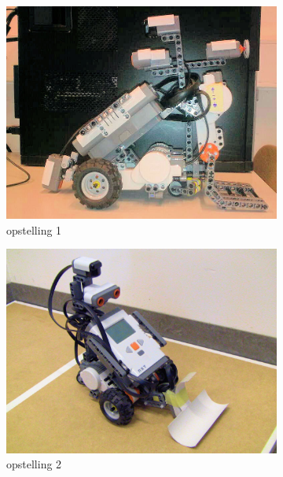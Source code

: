 \documentclass[tt2]{penoverslag}
\begin{document}
\begin{figure}
\centering
	\begin{subfigure}[h]{0.33\textwidth}
	\centering
		\includegraphics[width=\textwidth]{robotOud1}
		\caption{opstelling 1}
	\end{subfigure}%
	\begin{subfigure}[h]{0.33\textwidth}
		\centering
		\includegraphics[width=\textwidth]{robotOud2}
	\caption{opstelling 2}
	\end{subfigure}
	\begin{subfigure}[h]{0.33\textwidth}
		\centering

\end{subfigure}
\end{figure}
\end{document}
